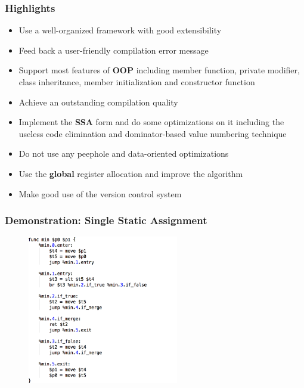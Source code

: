 \documentclass{beamer}
\begin{document}
	\begin{frame}
		\frametitle{Highlights}
		\begin{itemize}
			\item Use a well-organized framework with good extensibility
			\item Feed back a user-friendly compilation error message
			\item Support most features of \textbf{OOP} including member function, private modifier, class inheritance, member initialization and constructor function
			\item Achieve an outstanding compilation quality
			\item Implement the \textbf{SSA} form and do some optimizations on it including the useless code elimination and dominator-based value numbering technique
			\item<0-0> Do not use any peephole and data-oriented optimizations
			\item<0-0> Use the \textbf{global} register allocation and improve the algorithm
			\item<0-0> Make good use of the version control system
		\end{itemize}
	\end{frame}

	\begin{frame}
		\frametitle{Demonstration: Single Static Assignment}
		\begin{figure}[!htp]
			\includegraphics[height=6.5cm]{image/single-static-assignment/before-single-static-assignment}
		\end{figure}
	\end{frame}
	
\end{document}
